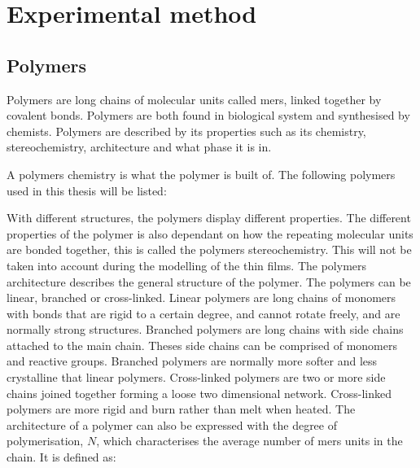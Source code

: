 \documentclass[MasterThesisMain.tex]{subfiles}
\begin{document}
	\chapter{Experimental method}\label{experimentalmethod}
	
	\section{Polymers}
Polymers are long chains of molecular units called mers, linked together by covalent bonds. Polymers are both found in biological system and synthesised by chemists. Polymers are described by its properties such as its chemistry, stereochemistry, architecture and what phase it is in. 

A polymers chemistry is what the polymer is built of. The following polymers used in this thesis will be listed: 







With different structures, the polymers display different properties. The different properties of the polymer is also dependant on how the repeating molecular units are bonded together, this is called the polymers stereochemistry. This will not be taken into account during the modelling of the thin films. The polymers architecture describes the general structure of the polymer. The polymers can be linear, branched or cross-linked. Linear polymers are long chains of monomers with bonds that are rigid to a certain degree, and cannot rotate freely, and are normally strong structures. Branched polymers are long chains with side chains attached to the main chain. Theses side chains can be comprised of monomers and reactive groups. Branched polymers are normally more softer and less crystalline that linear polymers. Cross-linked polymers are two or more side chains joined together forming a loose two dimensional network. Cross-linked polymers are more rigid and burn rather than melt when heated. The architecture of a polymer can also be expressed with the degree of polymerisation, $N$, which characterises the average number of mers units in the chain. It is defined as:
\end{document}
